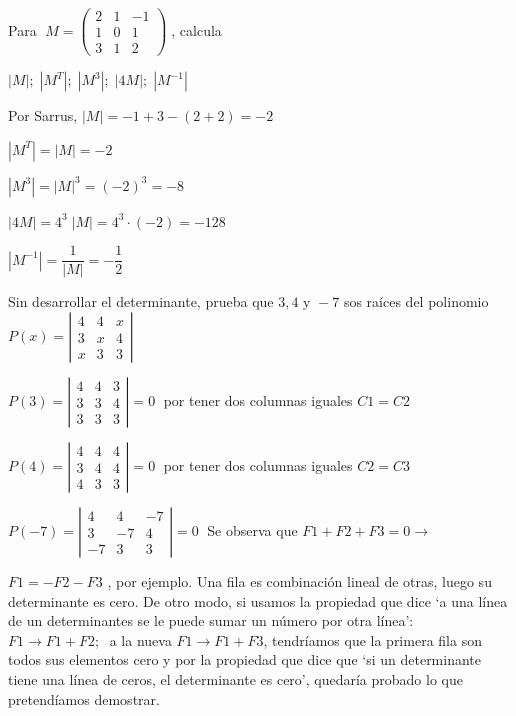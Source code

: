 \begin{ejre}
Para $\; M=\left( \begin{matrix} 2&1&-1\\1&0&1\\3&1&2 \end{matrix} \right)\; $, calcula 

$|M|; \; |M^T|; \; |M^3|; \; |4M|; \; |M^{-1}|$	
\end{ejre}

\begin{proofw}\renewcommand{\qedsymbol}{$\diamond$}

Por Sarrus, $|M|=-1+3-(2+2)=-2$

\begin{multicols}{2}
\noindent $|M^T|=|M|=-2$

\noindent $|M^3|=|M|^3=(-2)^3=-8$

\noindent $|4M|=4^3\;|M|=4^3\cdot (-2)=-128$

\noindent $|M^{-1}|= \dfrac 1 {|M|}= - \dfrac 1 2$	
\end{multicols}
\end{proofw}


\begin{ejre}
	Sin desarrollar el determinante, prueba que $3,4 \text{ y } -7$ sos raíces del polinomio $P(x)=\left| \begin{matrix} 4&4&x\\3&x&4\\x&3&3 \end{matrix} \right|$
\end{ejre}

\begin{proofw}\renewcommand{\qedsymbol}{$\diamond$}

$P(3)=\left| \begin{matrix} 4&4&3\\3&3&4\\3&3&3 \end{matrix} \right|=0\;$ por tener dos columnas iguales $C1=C2$

\noindent $P(4)=\left| \begin{matrix} 4&4&4\\3&4&4\\4&3&3 \end{matrix} \right|=0\; $ por tener dos columnas iguales $C2=C3$

\noindent $P(-7)=\left| \begin{matrix} 4&4&-7\\3&-7&4\\-7&3&3 \end{matrix} \right|=0\;$ Se observa que $F1+F2+F3=0 \to $

\noindent $F1=-F2-F3$ , por ejemplo. Una fila es combinación lineal de otras, luego su determinante es cero.  \small{De otro modo, si usamos la propiedad que dice `a una línea de un  determinantes se le puede sumar un número por otra línea': $F1\to F1+F2 ; \; $ a la nueva $F1\to F1+F3$, tendríamos que la primera fila son todos sus elementos cero y por la propiedad que dice que `si un determinante tiene una línea de ceros, el determinante es cero', quedaría probado lo que pretendíamos demostrar}\normalsize{.} 

\end{proofw}

